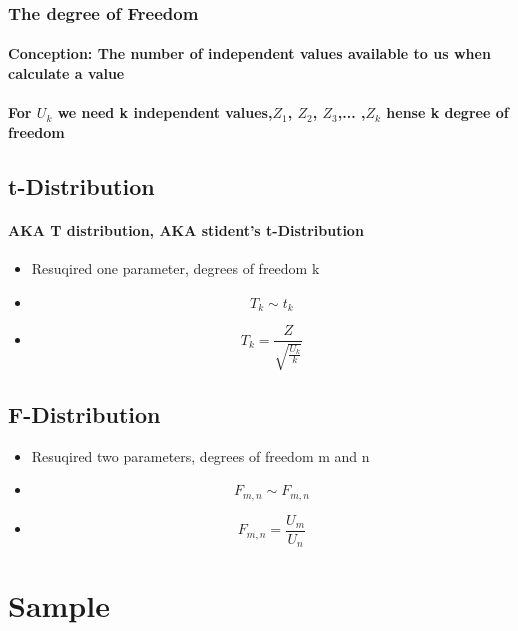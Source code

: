 \documentclass[11pt]{article} %
\begin{document}
\subsubsection{The degree of Freedom}
\paragraph{Conception: The number of independent values available to us when calculate a value}
\paragraph{For $U_k$ we need k independent values,$Z_1$, $Z_2$, $Z_3$,... ,$Z_k$ hense k degree of freedom}
% 
% 
% 
% 
% 
% 
% 
% 
\subsection{t-Distribution}
\paragraph{AKA T distribution, AKA stident's t-Distribution}
% 
% 
\begin{itemize}
    \item Resuqired one parameter, degrees of freedom k
    \item $$ T_k \sim t_k $$
    \item $$ T_k = \frac{Z}{\sqrt{\frac{U_k}{k}}} $$
\end{itemize}
% 
% 
% 
% 
% 
% 
% 
\subsection{F-Distribution}
% 
% 
\begin{itemize}
    \item Resuqired two parameters, degrees of freedom m and n
    \item $$ F_{m,n} \sim F_{m,n} $$
    \item $$ F_{m,n}=\frac{U_m}{U_n} $$
\end{itemize}
% 
% 
% 
% 
% 
% 
% 
% 
% 
% 
% 
% 
% 
% 
% 
% 
% 
% 
% 
% 
% 
% 
% 
% 
% 
% 
% 
% 
% 
% 
% 
% 
\section{Sample}
\end{document}
